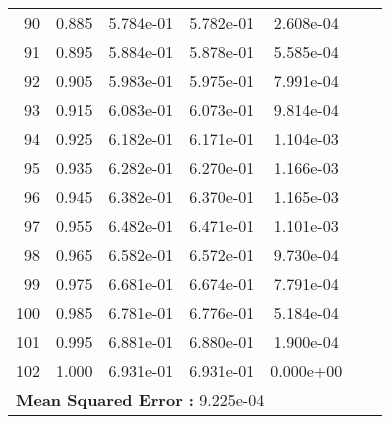 \begin{table}[ht]
\begin{tabular}{rcccccc}
    90 &  0.885 &       5.784e-01 &       5.782e-01  &        2.608e-04\\ 
    91 &  0.895 &       5.884e-01 &       5.878e-01  &        5.585e-04\\ 
    92 &  0.905 &       5.983e-01 &       5.975e-01  &        7.991e-04\\ 
    93 &  0.915 &       6.083e-01 &       6.073e-01  &        9.814e-04\\ 
    94 &  0.925 &       6.182e-01 &       6.171e-01  &        1.104e-03\\ 
    95 &  0.935 &       6.282e-01 &       6.270e-01  &        1.166e-03\\ 
    96 &  0.945 &       6.382e-01 &       6.370e-01  &        1.165e-03\\ 
    97 &  0.955 &       6.482e-01 &       6.471e-01  &        1.101e-03\\ 
    98 &  0.965 &       6.582e-01 &       6.572e-01  &        9.730e-04\\ 
    99 &  0.975 &       6.681e-01 &       6.674e-01  &        7.791e-04\\ 
    100 &  0.985 &       6.781e-01 &       6.776e-01  &        5.184e-04\\ 
    101 &  0.995 &       6.881e-01 &       6.880e-01  &        1.900e-04\\ 
    102 &  1.000 &       6.931e-01 &       6.931e-01  &        0.000e+00\\ 
    \hline
     \multicolumn{5}{l}{\textbf{Mean Squared Error :} 9.225e-04}\\ 
  \end{tabular}
  \label{lbl:tabloExmp1_test}
\end{table}
